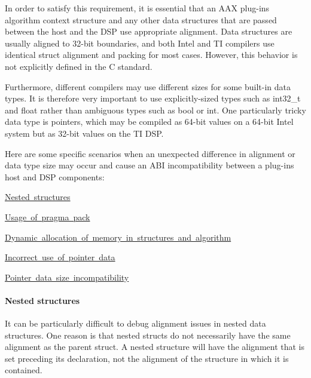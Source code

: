 In order to satisfy this requirement, it is essential that an A\+AX plug-\/in\textquotesingle{}s algorithm context structure and any other data structures that are passed between the host and the D\+SP use appropriate alignment. Data structures are usually aligned to 32-\/bit boundaries, and both Intel and TI compilers use identical struct alignment and packing for most cases. However, this behavior is not explicitly defined in the C standard.

Furthermore, different compilers may use different sizes for some built-\/in data types. It is therefore very important to use explicitly-\/sized types such as {\ttfamily int32\+\_\+t} and {\ttfamily float} rather than ambiguous types such as {\ttfamily bool} or {\ttfamily int}. One particularly tricky data type is pointers, which may be compiled as 64-\/bit values on a 64-\/bit Intel system but as 32-\/bit values on the TI D\+SP.

Here are some specific scenarios when an unexpected difference in alignment or data type size may occur and cause an A\+BI incompatibility between a plug-\/in\textquotesingle{}s host and D\+SP components\+:


\begin{DoxyItemize}
\item \mbox{\hyperlink{a00832_subsubsection__nested_structures}{Nested structures}}  
\item \mbox{\hyperlink{a00832_subsubsection__pragma_pack}{Usage of pragma pack}}  
\item \mbox{\hyperlink{a00832_subsubsection__dynamic_allocation_of_memory}{Dynamic allocation of memory in structures and algorithm}}  
\item \mbox{\hyperlink{a00832_subsubsection__incorrect_use_of_pointer_data}{Incorrect use of pointer data}}  
\item \mbox{\hyperlink{a00832_subsubsection__pointer_data_size_incompatibility}{Pointer data size incompatibility}}  
\end{DoxyItemize}

\hypertarget{a00832_subsubsection__nested_structures}{}\paragraph{Nested structures}\label{a00832_subsubsection__nested_structures}
It can be particularly difficult to debug alignment issues in nested data structures. One reason is that nested structs do not necessarily have the same alignment as the parent struct. A nested structure will have the alignment that is set preceding its declaration, not the alignment of the structure in which it is contained.

